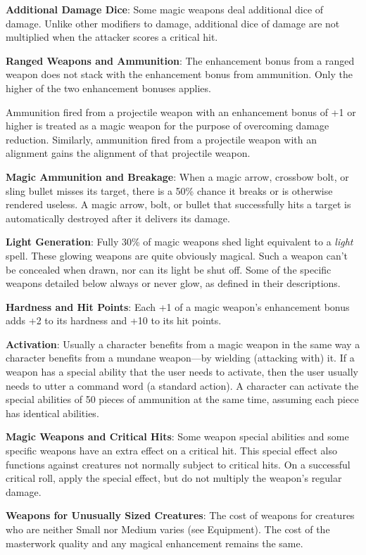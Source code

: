 \textbf{Additional Damage Dice}: Some magic weapons deal additional dice of damage. Unlike other modifiers to damage, additional dice of damage are not multiplied when the attacker scores a critical hit.
				
\textbf{Ranged Weapons and Ammunition}: The enhancement bonus from a ranged weapon does not stack with the enhancement bonus from ammunition. Only the higher of the two enhancement bonuses applies.
				
Ammunition fired from a projectile weapon with an enhancement bonus of +1 or higher is treated as a magic weapon for the purpose of overcoming damage reduction. Similarly, ammunition fired from a projectile weapon with an alignment gains the alignment of that projectile weapon.
				
\textbf{Magic Ammunition and Breakage}: When a magic arrow, crossbow bolt, or sling bullet misses its target, there is a 50\% chance it breaks or is otherwise rendered useless. A magic arrow, bolt, or bullet that successfully hits a target is automatically destroyed after it delivers its damage.
				
\textbf{Light Generation}: Fully 30\% of magic weapons shed light equivalent to a \textit{light }spell. These glowing weapons are quite obviously magical. Such a weapon can't be concealed when drawn, nor can its light be shut off. Some of the specific weapons detailed below always or never glow, as defined in their descriptions.
				
\textbf{Hardness and Hit Points}: Each +1 of a magic weapon's enhancement bonus adds +2 to its hardness and +10 to its hit points.
				
\textbf{Activation}: Usually a character benefits from a magic weapon in the same way a character benefits from a mundane weapon---by wielding (attacking with) it. If a weapon has a special ability that the user needs to activate, then the user usually needs to utter a command word (a standard action). A character can activate the special abilities of 50 pieces of ammunition at the same time, assuming each piece has identical abilities.
				
\textbf{Magic Weapons and Critical Hits}: Some weapon special abilities and some specific weapons have an extra effect on a critical hit. This special effect also functions against creatures not normally subject to critical hits. On a successful critical roll, apply the special effect, but do not multiply the weapon's regular damage. 
				
\textbf{Weapons for Unusually Sized Creatures}: The cost of weapons for creatures who are neither Small nor Medium varies (see Equipment). The cost of the masterwork quality and any magical enhancement remains the same.
				
